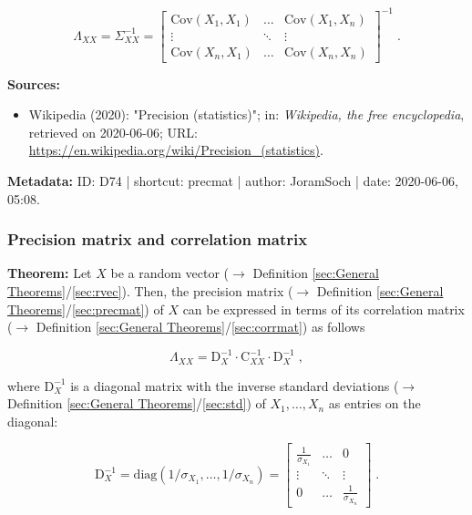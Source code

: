 \documentclass[a4paper,12pt,twoside]{book}
\begin{document}
\begin{equation} \label{eq:precmat-corrmat}
\Lambda_{XX} = \Sigma_{XX}^{-1} =
\begin{bmatrix}
\mathrm{Cov}(X_1,X_1) & \ldots & \mathrm{Cov}(X_1,X_n) \\
\vdots & \ddots & \vdots \\
\mathrm{Cov}(X_n,X_1) & \ldots & \mathrm{Cov}(X_n,X_n)
\end{bmatrix}^{-1} \; .
\end{equation}


\vspace{1em}
\textbf{Sources:}
\begin{itemize}
\item Wikipedia (2020): "Precision (statistics)"; in: \textit{Wikipedia, the free encyclopedia}, retrieved on 2020-06-06; URL: \url{https://en.wikipedia.org/wiki/Precision_(statistics)}.
\end{itemize}


\vspace{1em}
\textbf{Metadata:} ID: D74 | shortcut: precmat | author: JoramSoch | date: 2020-06-06, 05:08.
\vspace{1em}



\subsubsection[\textbf{Precision matrix and correlation matrix}]{Precision matrix and correlation matrix} \label{sec:precmat-corrmat}
\setcounter{equation}{0}

\textbf{Theorem:} Let $X$ be a random vector ($\rightarrow$ Definition \ref{sec:General Theorems}/\ref{sec:rvec}). Then, the precision matrix ($\rightarrow$ Definition \ref{sec:General Theorems}/\ref{sec:precmat}) of $X$ can be expressed in terms of its correlation matrix ($\rightarrow$ Definition \ref{sec:General Theorems}/\ref{sec:corrmat}) as follows

\begin{equation} \label{eq:precmat-corrmat-precmat-corrmat}
\Lambda_{XX} = \mathrm{D}_X^{-1} \cdot \mathrm{C}_{XX}^{-1} \cdot \mathrm{D}_X^{-1} \; ,
\end{equation}

where $\mathrm{D}_X^{-1}$ is a diagonal matrix with the inverse standard deviations ($\rightarrow$ Definition \ref{sec:General Theorems}/\ref{sec:std}) of $X_1, \ldots, X_n$ as entries on the diagonal:

\begin{equation} \label{eq:precmat-corrmat-invdiagmat}
\mathrm{D}_X^{-1} = \mathrm{diag}(1/\sigma_{X_1},\ldots,1/\sigma_{X_n}) =
\begin{bmatrix}
\frac{1}{\sigma_{X_1}} & \ldots & 0 \\
\vdots & \ddots & \vdots \\
0 & \ldots & \frac{1}{\sigma_{X_n}}
\end{bmatrix} \; .
\end{equation}
\end{document}
